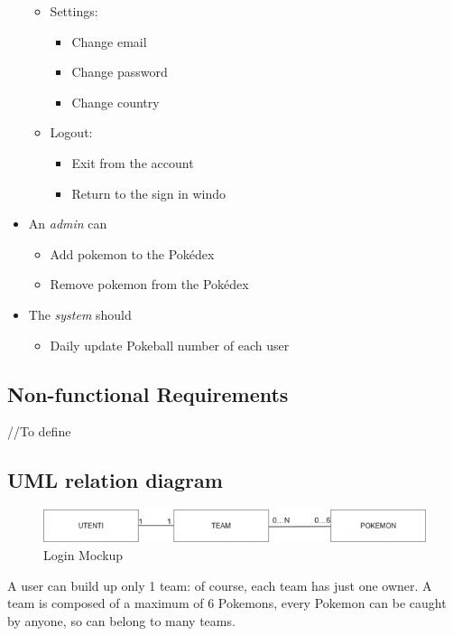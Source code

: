 \begin{itemize}
\begin{itemize}
        \item Settings:
        \begin{itemize}
            \item Change email
            \item Change password
            \item Change country
        \end{itemize}
        \item Logout:
        \begin{itemize}
            \item Exit from the account
            \item Return to the sign in windo
        \end{itemize}
    \end{itemize}
    \item An \textit{admin} can
    \begin{itemize}
        \item Add pokemon to the Pokédex
        \item Remove pokemon from the Pokédex
    \end{itemize}
    \item The \textit{system} should
    \begin{itemize}
        \item Daily update Pokeball number of each user
    \end{itemize}
\end{itemize}
\subsection{Non-functional Requirements}
//To define
\subsection{UML relation diagram}

\begin{figure}[h]
    \centering
    \includegraphics[width=\textwidth]{img/Picture7.png}
    \caption{Login Mockup}
\end{figure}

A user can build up only 1 team: of course, each team has just one owner.
A team is composed of a maximum of 6 Pokemons, every Pokemon can be caught by anyone, so can belong to many teams.
